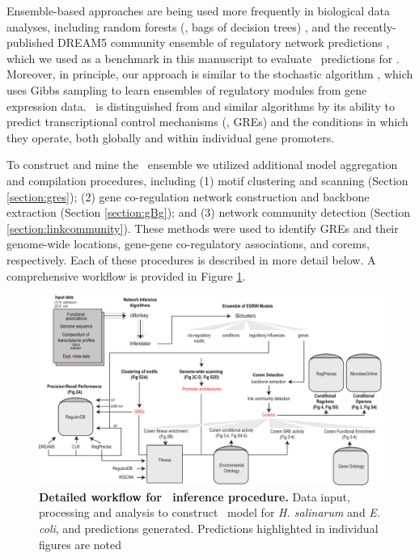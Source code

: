Ensemble-based approaches are being used more frequently in biological data analyses, including random forests (\ie, bags of decision trees) \cite{breiman_bagging_1996}, and the recently-published DREAM5 community ensemble of regulatory network predictions \cite{marbach_wisdom_2012}, which we used as a benchmark in this manuscript to evaluate \egrine\ predictions for \eco. Moreover, in principle, our approach is similar to the stochastic  algorithm \cite{joshi_module_2009}, which uses Gibbs sampling to learn ensembles of regulatory modules from gene expression data. \egrine~is distinguished from  and similar algorithms by its ability to predict transcriptional control mechanisms (\ie, GREs) and the conditions in which they operate, both globally and within individual gene promoters.

To construct and mine the \egrine~ensemble we utilized additional model aggregation and compilation procedures, including (1) motif clustering \cite{van_dongen_using_2012} and scanning \cite{bailey_methods_1998} (Section \ref{section:gres}); (2) gene co-regulation network construction and backbone extraction \cite{serrano_extracting_2009} (Section \ref{section:gBg}); and (3) network community detection \cite{ahn_link_2010} (Section \ref{section:linkcommunity}). These methods were used to identify GREs and their genome-wide locations, gene-gene co-regulatory associations, and corems, respectively. Each of these procedures is described in more detail below. A comprehensive workflow is provided in Figure \ref{fig:workflow}.

\begin{figure}[h!]
\centering
\includegraphics[width=\linewidth]{figures/workflow.pdf}
\caption[Detailed workflow for \egrine~inference procedure]{
{\bf Detailed workflow for \egrine~inference procedure.} Data input, processing and analysis to construct \egrine~model for {\it H. salinarum} and {\it E. coli}, and predictions generated. Predictions highlighted in individual figures are noted}\label{fig:workflow}
\end{figure}

